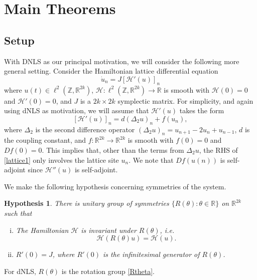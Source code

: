 \documentclass[12pt]{article}
\def\R{{\mathbb R}}
\def\Z{{\mathbb Z}}
\newtheorem{hypothesis}{Hypothesis}
\begin{document}
\section{Main Theorems}

\subsection{Setup}

With DNLS as our principal motivation, we will consider the following more general setting. Consider the Hamiltonian lattice differential equation 
\begin{equation}\label{lattice1}
\dot{u}_n = J [\mathcal{H}'(u)]_n
\end{equation}
where $u(t) \in \ell^2(\Z, \R^{2k})$, $\mathcal{H}: \ell^2(\Z, \R^{2k}) \rightarrow \R$ is smooth with $\mathcal{H}(0) = 0$ and $\mathcal{H}'(0) = 0$, and $J$ is a $2k \times 2k$ symplectic matrix. For simplicity, and again using dNLS as motivation, we will assume that $\mathcal{H}'(u)$ takes the form
\begin{equation}\label{latticeform}
[\mathcal{H}'(u)]_n = d (\Delta_2 u)_n + f(u_n),
\end{equation}
where $\Delta_2$ is the second difference operator $(\Delta_2 u)_n = u_{n+1} - 2 u_n + u_{n-1}$, $d$ is the coupling constant, and $f: \R^{2k} \rightarrow \R^{2k}$ is smooth with $f(0) = 0$ and $Df(0) = 0$. This implies that, other than the terms from $\Delta_2 u$, the RHS of \eqref{lattice1} only involves the lattice site $u_n$. We note that $Df(u(n))$ is self-adjoint since $\mathcal{H}''(u)$ is self-adjoint.

We make the following hypothesis concerning symmetries of the system.
\begin{hypothesis}\label{symmetryhyp}
There is unitary group of symmetries $\{ R(\theta) : \theta \in \R \}$ on $\R^{2k}$ such that 
\begin{enumerate}[(i)]
\item The Hamiltonian $\mathcal{H}$ is invariant under $R(\theta)$, i.e. 
\begin{equation}\label{Hinvariance}
\mathcal{H}(R(\theta)u) = \mathcal{H}(u).
\end{equation}
\item $R'(0) = J$, where $R'(0)$ is the infinitesimal generator of $R(\theta)$.
\end{enumerate}
\end{hypothesis}
\noindent For dNLS, $R(\theta)$ is the rotation group \eqref{Rtheta}.
\end{document}
